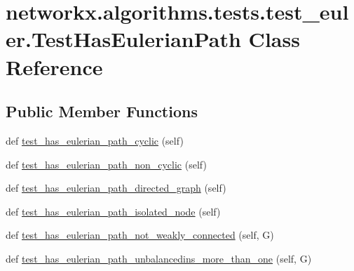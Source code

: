 \hypertarget{classnetworkx_1_1algorithms_1_1tests_1_1test__euler_1_1TestHasEulerianPath}{}\section{networkx.\+algorithms.\+tests.\+test\+\_\+euler.\+Test\+Has\+Eulerian\+Path Class Reference}
\label{classnetworkx_1_1algorithms_1_1tests_1_1test__euler_1_1TestHasEulerianPath}
\subsection*{Public Member Functions}
\begin{DoxyCompactItemize}
\item 
def \hyperlink{classnetworkx_1_1algorithms_1_1tests_1_1test__euler_1_1TestHasEulerianPath_ace0204d2bf56e0c8701d3e169d34e692}{test\+\_\+has\+\_\+eulerian\+\_\+path\+\_\+cyclic} (self)
\item 
def \hyperlink{classnetworkx_1_1algorithms_1_1tests_1_1test__euler_1_1TestHasEulerianPath_a5620541d2c98b53b441b494c72ea9791}{test\+\_\+has\+\_\+eulerian\+\_\+path\+\_\+non\+\_\+cyclic} (self)
\item 
def \hyperlink{classnetworkx_1_1algorithms_1_1tests_1_1test__euler_1_1TestHasEulerianPath_a3ceadf3aa13743359ef8c4e419b329ed}{test\+\_\+has\+\_\+eulerian\+\_\+path\+\_\+directed\+\_\+graph} (self)
\item 
def \hyperlink{classnetworkx_1_1algorithms_1_1tests_1_1test__euler_1_1TestHasEulerianPath_a63c7e39e97961937fba4bf47281549e1}{test\+\_\+has\+\_\+eulerian\+\_\+path\+\_\+isolated\+\_\+node} (self)
\item 
def \hyperlink{classnetworkx_1_1algorithms_1_1tests_1_1test__euler_1_1TestHasEulerianPath_a18e0509b36c8d6ae15359e27a4cce5d1}{test\+\_\+has\+\_\+eulerian\+\_\+path\+\_\+not\+\_\+weakly\+\_\+connected} (self, G)
\item 
def \hyperlink{classnetworkx_1_1algorithms_1_1tests_1_1test__euler_1_1TestHasEulerianPath_a036628c6ce3d8794de6d671a3f2bbb21}{test\+\_\+has\+\_\+eulerian\+\_\+path\+\_\+unbalancedins\+\_\+more\+\_\+than\+\_\+one} (self, G)
\end{DoxyCompactItemize}


